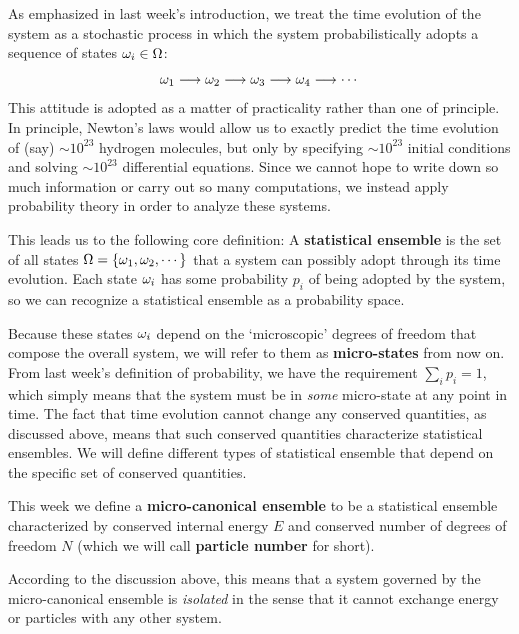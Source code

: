 As emphasized in last week's introduction, we treat the time evolution of the system as a stochastic process in which the system probabilistically adopts a sequence of states $\omega_i \in \Omega$:
\begin{equation*}
  \omega_1 \longrightarrow \omega_2 \longrightarrow \omega_3 \longrightarrow \omega_4 \longrightarrow \cdots
\end{equation*}
This attitude is adopted as a matter of practicality rather than one of principle.
In principle, Newton's laws would allow us to exactly predict the time evolution of (say) $\sim$$10^{23}$ hydrogen molecules, but only by specifying $\sim$$10^{23}$ initial conditions and solving $\sim$$10^{23}$ differential equations.
Since we cannot hope to write down so much information or carry out so many computations, we instead apply probability theory in order to analyze these systems.

\begin{shaded}
  This leads us to the following core definition: A \textbf{statistical ensemble} is the set of all states $\Omega = \left\{\omega_1, \omega_2, \cdots\right\}$ that a system can possibly adopt through its time evolution.
  Each state $\omega_i$ has some probability $p_i$ of being adopted by the system, so we can recognize a statistical ensemble as a probability space.
\end{shaded}

Because these states $\omega_i$ depend on the `microscopic' degrees of freedom that compose the overall system, we will refer to them as \textbf{micro-states} from now on.
From last week's definition of probability, we have the requirement $\sum_i p_i = 1$, which simply means that the system must be in \textit{some} micro-state at any point in time.
The fact that time evolution cannot change any conserved quantities, as discussed above, means that such conserved quantities characterize statistical ensembles.
We will define different types of statistical ensemble that depend on the specific set of conserved quantities.

\begin{shaded}
  This week we define a \textbf{micro-canonical ensemble} to be a statistical ensemble characterized by conserved internal energy $E$ and conserved number of degrees of freedom $N$ (which we will call \textbf{particle number} for short).
\end{shaded}

According to the discussion above, this means that a system governed by the micro-canonical ensemble is \textit{isolated} in the sense that it cannot exchange energy or particles with any other system.

